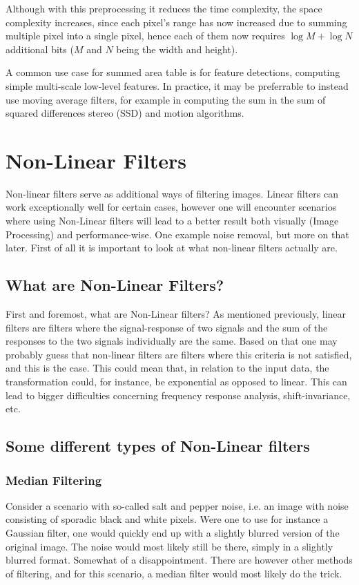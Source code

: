 \documentclass[twoside,a4paper,article]{combine}
\begin{document}
Although with this preprocessing it reduces the time complexity, the space complexity increases, since each pixel's range has now increased due to summing multiple pixel into a single pixel,
hence each of them now requires $\log M + \log N$ additional bits ($M$ and $N$ being the width and height)\cite{Szeliski_2022}.

A common use case for summed area table is for feature detections, computing simple multi-scale low-level features. In practice, it may be preferrable to instead use 
moving average filters, for example in computing the sum in the sum of squared differences stereo (SSD) and motion algorithms\cite{Szeliski_2022}.\footnotemark{}


\section{Non-Linear Filters}
Non-linear filters serve as additional ways of filtering images. Linear filters can work exceptionally well for certain cases, however one will encounter scenarios where using Non-Linear filters will lead to a better result both visually (Image Processing) and performance-wise. One example noise removal, but more on that later. First of all it is important to look at what non-linear filters actually are.

\subsection{What are Non-Linear Filters?}
First and foremost, what are Non-Linear filters? As mentioned previously, linear filters are filters where the signal-response of two signals and the sum of the responses to the two signals individually are the same. Based on that one may probably guess that non-linear filters are filters where this criteria is not satisfied, and this is the case. This could mean that, in relation to the input data, the transformation could, for instance, be exponential as opposed to linear. This can lead to bigger difficulties concerning frequency response analysis,\cite[p.~132]{szeliski} shift-invariance, etc.
\subsection{Some different types of Non-Linear filters}
\subsubsection{Median Filtering}
Consider a scenario with so-called salt and pepper noise, i.e. an image with noise consisting of sporadic black and white pixels. Were one to use for instance a Gaussian filter, one would quickly end up with a slightly blurred version of the original image. The noise would most likely still be there, simply in a slightly blurred format. Somewhat of a disappointment. There are however other methods of filtering, and for this scenario, a median filter would most likely do the trick.
\end{document}
